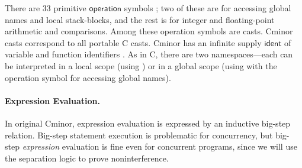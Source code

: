 \documentclass{llncs}
\newcommand{\cminor}{Cminor}
\newcommand{\tyface}[1]{\ensuremath{\mathsf{#1}}}
\begin{document}
There are 33 primitive \tyface{operation} symbols ;
two of these are for accessing global names and
local stack-blocks, and the rest is for integer and
floating-point arithmetic and comparisons.
Among these operation symbols are casts.
\cminor{} casts correspond to all portable C casts.
\cminor{} has an infinite supply \tyface{ident} of
variable and function identifiers .  
As in C, there are two namespaces---each 
 can be interpreted in a local
scope (using ) or in a global scope
(using 
 with the operation symbol for accessing global names).

\vspace{-20pt}


\paragraph{Expression Evaluation.}
In original \cminor{}, expression evaluation is expressed by an inductive big-step relation.
Big-step statement execution is problematic for concurrency, but
big-step \emph{expression} evaluation is fine even for concurrent
programs, since we will use the separation logic to prove
noninterference.
\end{document}
